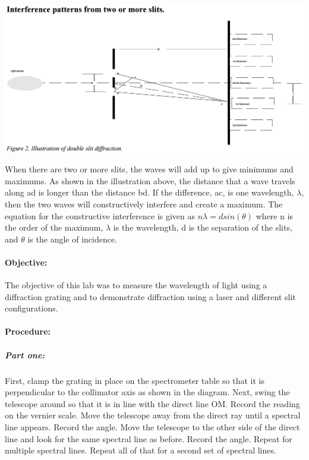 \documentclass[12pt]{article}
\begin{document}
\begin{center}
\includegraphics[width=17cm]{multislit_part2.png}
\end{center}

When there are two or more slits, the waves will add up to give minimums and maximums. As shown in the illustration above, the distance that a wave travels along ad is longer than the distance bd. If the difference, ac, is one wavelength, $\lambda$, then the two waves will constructively interfere and create a maximum. The equation for the constructive interference is given as $n \lambda = d sin(\theta)$ where n is the order of the maximum, $\lambda$ is the wavelength, d is the separation of the slits, and $\theta$ is the angle of incidence. 

\paragraph{Objective:} The objective of this lab was to measure the wavelength of light using a diffraction grating and to demonstrate diffraction using a laser and different slit configurations.

\paragraph{Procedure:}

\subparagraph{Part one:} First, clamp the grating in place on the spectrometer table so that it is perpendicular to the collimator axis as shown in the diagram. Next, swing the telescope around so that it is in line with the direct line OM. Record the reading on the vernier scale. Move the telescope away from the direct ray until a spectral line appears. Record the angle. Move the telescope to the other side of the direct line and look for the same spectral line as before. Record the angle. Repeat for multiple spectral lines. Repeat all of that for a second set of spectral lines.
\end{document}
